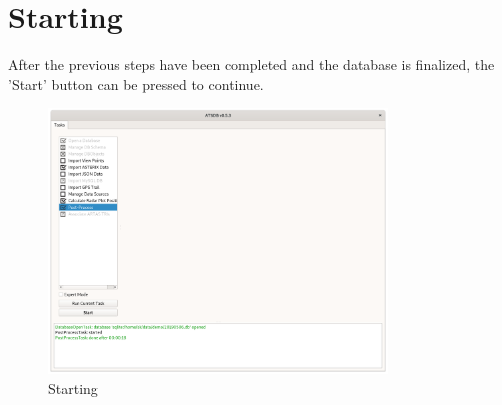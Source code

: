 \section{Starting}
\label{sec:startup_starting}

After the previous steps have been completed and the database is finalized, the 'Start' button can be pressed to continue. \\

\begin{figure}[H]
  \center
    \includegraphics[width=9cm,frame]{../screenshots/start.png}
  \caption{Starting}
\end{figure}

